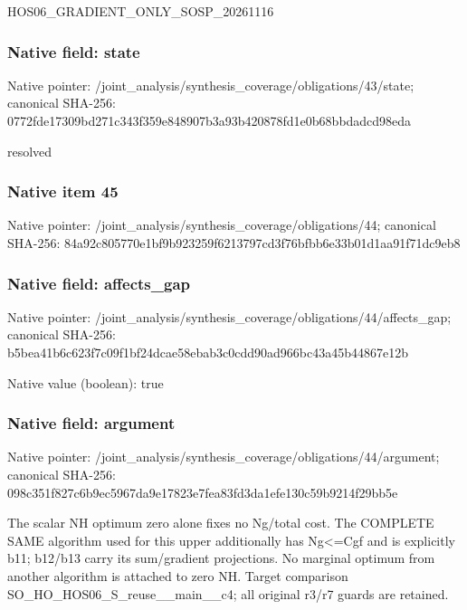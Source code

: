 \documentclass[10pt,a4paper]{article}
\begin{document}
\begingroup\raggedright\sloppy HOS06\_\allowbreak{}GRADIENT\_\allowbreak{}ONLY\_\allowbreak{}SOSP\_\allowbreak{}20261116\par\endgroup

\subsubsection{Native field: state}
Native pointer: /joint\_\allowbreak{}analysis/synthesis\_\allowbreak{}coverage/obligations/43/state; canonical SHA-256: 0772fde17309bd271c343f359e848907b3a93b420878fd1e0b68bbdadcd98eda

\begingroup\raggedright\sloppy resolved\par\endgroup

\subsubsection{Native item 45}
Native pointer: /joint\_\allowbreak{}analysis/synthesis\_\allowbreak{}coverage/obligations/44; canonical SHA-256: 84a92c805770e1bf9b923259f6213797cd3f76bfbb6e33b01d1aa91f71dc9eb8

\subsubsection{Native field: affects\_\allowbreak{}gap}
Native pointer: /joint\_\allowbreak{}analysis/synthesis\_\allowbreak{}coverage/obligations/44/affects\_\allowbreak{}gap; canonical SHA-256: b5bea41b6c623f7c09f1bf24dcae58ebab3c0cdd90ad966bc43a45b44867e12b

Native value (boolean): true

\subsubsection{Native field: argument}
Native pointer: /joint\_\allowbreak{}analysis/synthesis\_\allowbreak{}coverage/obligations/44/argument; canonical SHA-256: 098c351f827c6b9ec5967da9e17823e7fea83fd3da1efe130c59b9214f29bb5e

\begingroup\raggedright\sloppy The scalar NH optimum zero alone fixes no Ng/\allowbreak{}total cost. The COMPLETE SAME algorithm used for this upper additionally has Ng<=\allowbreak{}Cgf and is explicitly b11;\allowbreak{} b12/\allowbreak{}b13 carry its sum/\allowbreak{}gradient projections. No marginal optimum from another algorithm is attached to zero NH. Target comparison SO\_\allowbreak{}HO\_\allowbreak{}HOS06\_\allowbreak{}S\_\allowbreak{}reuse\_\allowbreak{}\_\allowbreak{}main\_\allowbreak{}\_\allowbreak{}c4;\allowbreak{} all original r3/\allowbreak{}r7 guards are retained.\par\endgroup
\end{document}
